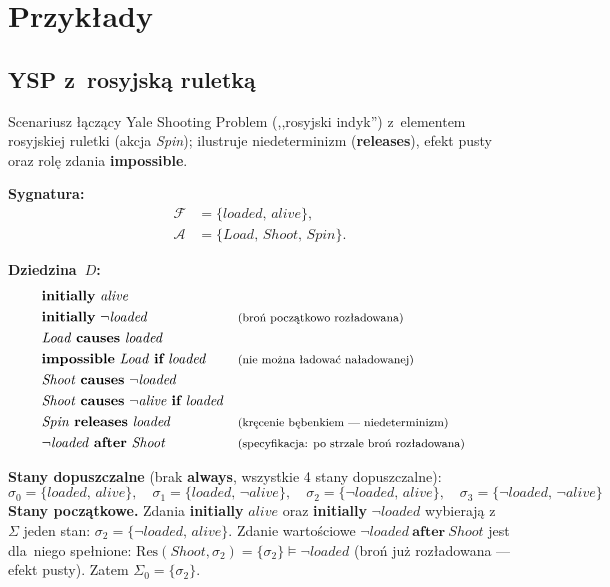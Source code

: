 \documentclass[11pt,a4paper]{article}
\newif\ifshowbib
\newcommand{\bibonly}[1]{\ifshowbib#1\fi}
\renewcommand{\cite}[2][]{\unskip}%
\newcommand{\causes}{\textbf{causes}}
\newcommand{\aft}{\textbf{after}}
\renewcommand{\iff}{\textbf{if}}
\newcommand{\initially}{\textbf{initially}}
\newcommand{\always}{\textbf{always}}
\newcommand{\impossible}{\textbf{impossible}}
\newcommand{\releases}{\textbf{releases}}
\newcommand{\cmt}[1]{\text{\footnotesize\normalfont (#1)}}
\theoremstyle{definition}
\begin{document}
\section{Przykłady}

\subsection{YSP z~rosyjską ruletką}
\label{sec:ex-ysp}

\noindent Scenariusz łączący Yale Shooting Problem (,,rosyjski indyk''\bibonly{,~\cite{rw02}})
z~elementem rosyjskiej ruletki (akcja \textit{Spin}); ilustruje niedeterminizm (\releases{}),
efekt pusty oraz rolę zdania \impossible{}.

\medskip
\noindent\textbf{Sygnatura:}
\begin{align*}
  \mathcal{F} &= \{\mathit{loaded},\, \mathit{alive}\}, \\
  \mathcal{A} &= \{\mathit{Load},\, \mathit{Shoot},\, \mathit{Spin}\}.
\end{align*}

\medskip
\noindent\textbf{Dziedzina~$D$:}
{\small
\begin{align*}
  &\initially\ \mathit{alive} \\
  &\initially\ \neg\mathit{loaded}
    && \cmt{broń początkowo rozładowana} \\
  &\mathit{Load}\ \causes\ \mathit{loaded} \\
  &\impossible\ \mathit{Load}\ \iff\ \mathit{loaded}
    && \cmt{nie można ładować naładowanej} \\
  &\mathit{Shoot}\ \causes\ \neg\mathit{loaded} \\
  &\mathit{Shoot}\ \causes\ \neg\mathit{alive}\ \iff\ \mathit{loaded} \\
  &\mathit{Spin}\ \releases\ \mathit{loaded}
    && \cmt{kręcenie bębenkiem --- niedeterminizm} \\
  &\neg\mathit{loaded}\ \aft\ \mathit{Shoot}
    && \cmt{specyfikacja: po strzale broń rozładowana}
\end{align*}
}

\noindent\textbf{Stany dopuszczalne}
(brak \always{}, wszystkie 4 stany dopuszczalne):
\[
  \sigma_0 = \{\mathit{loaded},\,\mathit{alive}\}, \quad
  \sigma_1 = \{\mathit{loaded},\,\neg\mathit{alive}\}, \quad
  \sigma_2 = \{\neg\mathit{loaded},\,\mathit{alive}\}, \quad
  \sigma_3 = \{\neg\mathit{loaded},\,\neg\mathit{alive}\}
\]
\noindent\textbf{Stany początkowe.} Zdania \initially{} $\mathit{alive}$ oraz
\initially{} $\neg\mathit{loaded}$ wybierają z~$\Sigma$ jeden stan:
$\sigma_2 = \{\neg\mathit{loaded},\,\mathit{alive}\}$.
Zdanie wartościowe $\neg\mathit{loaded}\ \aft\ \mathit{Shoot}$ jest dla~niego
spełnione: $\mathrm{Res}(\mathit{Shoot}, \sigma_2) = \{\sigma_2\} \models \neg\mathit{loaded}$
(broń już rozładowana --- efekt pusty). Zatem $\Sigma_0 = \{\sigma_2\}$.
\end{document}
